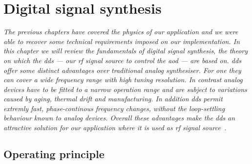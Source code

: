\chapter{Digital signal synthesis}\label{ch:digital_signal_synthesis}

\textit{The previous chapters have covered the physics of our application and
we were able to recover some technical requirements imposed on our
implementation. In this chapter we will review the fundamentals of digital
signal synthesis, the theory on which the \gls{dds} --- our \gls{rf} signal
source to control the \gls{aod} --- are based on. \gls{dds} offer some
distinct advantages over traditional analog synthesiser. For one they can
cover a wide frequency range with high tuning resolution. In contrast analog
devices have to be fitted to a narrow operation range and are subject to
variations caused by aging, thermal drift and manufacturing. In addition
\gls{dds} permit extremly fast, phase-continous frequency changes,
without the loop-settling behaviour known to analog devices. Overall these
advantages make the \gls{dds} an attractive solution for our application where
it is used as \gls{rf} signal source~\cite{ADTutDDS}.}

\section{Operating principle}

